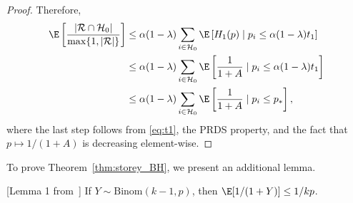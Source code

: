 \begin{proof}
  Therefore,
    \begin{align*}
      \E\left[\frac{|\mathcal{R} \cap \mathcal{H}_0|}{\max\{1, |\mathcal{R}|\} } \right] & \le \alpha(1 - \lambda)\sum_{i\in \mathcal{H}_0}\E\left[ H_1(p)\mid p_i \le \alpha(1 - \lambda)t_1\right]\\
           & \le \alpha(1 - \lambda)\sum_{i\in \mathcal{H}_0}\E\left[ \frac{1}{1 + A}\mid p_i \le \alpha(1 - \lambda)t_1\right]\\
      &\le \alpha(1 - \lambda)\sum_{i\in \mathcal{H}_0}\E\left[ \frac{1}{1 + A}\mid p_i \le p_{*}\right],
    \end{align*}
    where the last step follows from \eqref{eq:t1}, the PRDS property, and the fact that $p\mapsto 1 / (1 + A)$ is decreasing element-wise.
\end{proof}

To prove Theorem~\ref{thm:storey_BH}, we present an additional lemma.
\begin{lemma}\label{lem:inverse_binomial}[Lemma 1 from~\cite{benjamini2006adaptive}]
  If $Y\sim \mathrm{Binom}(k - 1, p)$, then $\E[1 / (1 + Y)]\le 1 / kp$.
\end{lemma}

